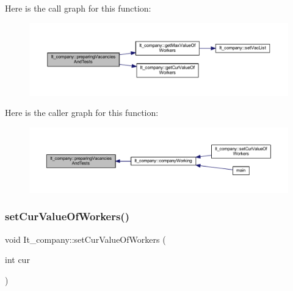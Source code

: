 Here is the call graph for this function\+:
\nopagebreak
\begin{figure}[H]
\begin{center}
\leavevmode
\includegraphics[width=350pt]{class_it__company_ab5f464351646bc6458640391f5eab298_cgraph}
\end{center}
\end{figure}
Here is the caller graph for this function\+:
\nopagebreak
\begin{figure}[H]
\begin{center}
\leavevmode
\includegraphics[width=350pt]{class_it__company_ab5f464351646bc6458640391f5eab298_icgraph}
\end{center}
\end{figure}
\hypertarget{class_it__company_ae06d651e9611d19f02bc1c7f29f2e988}{}\label{class_it__company_ae06d651e9611d19f02bc1c7f29f2e988} 
\subsubsection{\texorpdfstring{set\+Cur\+Value\+Of\+Workers()}{setCurValueOfWorkers()}}
{\footnotesize\ttfamily void It\+\_\+company\+::set\+Cur\+Value\+Of\+Workers (\begin{DoxyParamCaption}\item[{int}]{cur }\end{DoxyParamCaption})\hspace{0.3cm}{\ttfamily [inline]}}

